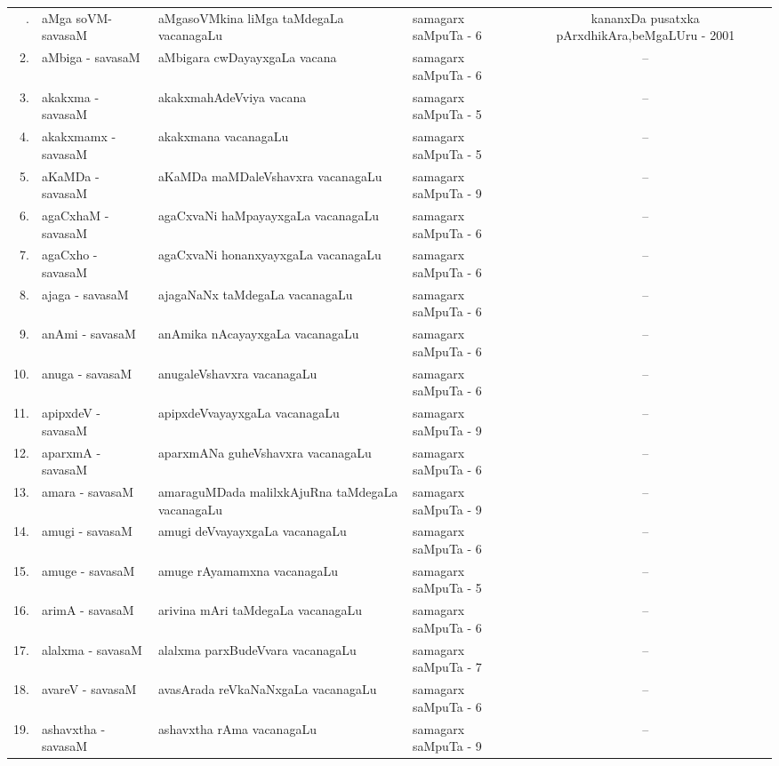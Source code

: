 {\renewcommand{\arraystretch}{1.3}
\begin{longtable}{rl>{\raggedright}p{5.5cm}lc}
\hline
\endfirsthead
\hline
\endhead
\hline
\endfoot
\endlastfoot
1. & aMga soVM-savasaM & aMgasoVMkina liMga taMdegaLa vacanagaLu & samagarx saMpuTa - 6 & \multicolumn{1}{p{3.5cm}}{kananxDa pusatxka pArxdhikAra,\newline beMgaLUru - 2001}\\
2. & aMbiga - savasaM & aMbigara cwDayayxgaLa vacana & samagarx saMpuTa - 6 & --\\
3. & akakxma - savasaM & akakxmahAdeVviya vacana & samagarx saMpuTa - 5 & --\\
4. & akakxmamx - savasaM & akakxmana vacanagaLu & samagarx saMpuTa - 5 & --\\
5. & aKaMDa - savasaM & aKaMDa maMDaleVshavxra vacanagaLu & samagarx saMpuTa - 9 & --\\
6. & agaCxhaM - savasaM & agaCxvaNi haMpayayxgaLa vacanagaLu & samagarx saMpuTa - 6 & --\\
7. & agaCxho - savasaM & agaCxvaNi honanxyayxgaLa vacanagaLu & samagarx saMpuTa - 6 & --\\
8. & ajaga - savasaM & ajagaNaNx taMdegaLa vacanagaLu & samagarx saMpuTa - 6 & --\\
9. & anAmi - savasaM & anAmika nAcayayxgaLa vacanagaLu & samagarx saMpuTa - 6 & --\\
10. & anuga - savasaM &  anugaleVshavxra vacanagaLu & samagarx saMpuTa - 6 & --\\
11. & apipxdeV - savasaM & apipxdeVvayayxgaLa vacanagaLu & samagarx saMpuTa - 9 & --\\
12. & aparxmA - savasaM & aparxmANa guheVshavxra vacanagaLu & samagarx saMpuTa - 6 & --\\
13. & amara - savasaM & amaraguMDada malilxkAjuRna taMdegaLa vacanagaLu & samagarx saMpuTa - 9 & --\\
14. & amugi - savasaM & amugi deVvayayxgaLa vacanagaLu & samagarx saMpuTa - 6 & --\\
15. & amuge - savasaM & amuge rAyamamxna vacanagaLu & samagarx saMpuTa - 5 & --\\
16. & arimA - savasaM & arivina mAri taMdegaLa vacanagaLu & samagarx saMpuTa - 6 & --\\
17. & alalxma - savasaM & alalxma parxBudeVvara vacanagaLu & samagarx saMpuTa - 7 & --\\
18. & avareV - savasaM &  avasArada reVkaNaNxgaLa vacanagaLu & samagarx saMpuTa - 6 & --\\
19. & ashavxtha - savasaM & ashavxtha rAma vacanagaLu & samagarx saMpuTa - 9 & --\\
\hline
\end{longtable}}

